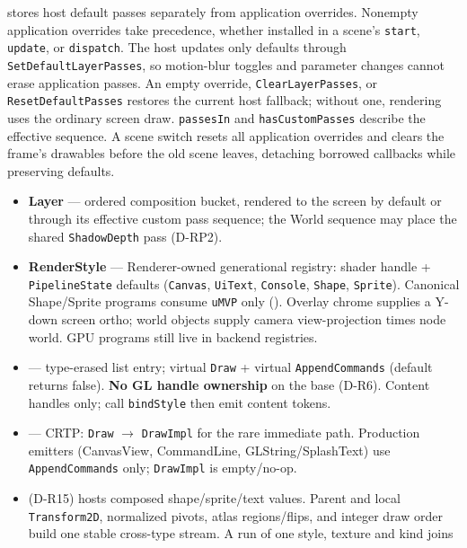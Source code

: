  stores host default passes separately from application
overrides. Nonempty application overrides take precedence, whether installed
in a scene's \texttt{start}, \texttt{update}, or \texttt{dispatch}. The host
updates only defaults through \texttt{SetDefaultLayerPasses}, so motion-blur
toggles and parameter changes cannot erase application passes. An empty
override, \texttt{ClearLayerPasses}, or \texttt{ResetDefaultPasses} restores
the current host fallback; without one, rendering uses the ordinary screen
draw. \texttt{passesIn} and \texttt{hasCustomPasses} describe the effective
sequence. A scene switch resets all application overrides and clears the
frame's drawables before the old scene leaves, detaching borrowed callbacks
while preserving defaults.
\begin{itemize}
  \item \textbf{Layer} --- ordered composition bucket, rendered to the screen
        by default or through its effective custom pass sequence; the World
        sequence may place the shared \texttt{ShadowDepth} pass (D-RP2).
  \item \textbf{RenderStyle} --- Renderer-owned generational registry: shader handle +
        \texttt{PipelineState} defaults (\texttt{Canvas}, \texttt{UiText},
        \texttt{Console}, \texttt{Shape}, \texttt{Sprite}). Canonical Shape/Sprite
        programs consume \texttt{uMVP} only (). Overlay
        chrome supplies a Y-down screen ortho; world objects supply camera
        view-projection times node world. GPU programs still live in backend
        registries.
  \item {} --- type-erased list entry; virtual
        \texttt{Draw} + virtual \texttt{AppendCommands} (default returns false).
        \textbf{No GL handle ownership} on the base (D-R6). Content handles
        only; call \texttt{bindStyle} then emit content tokens.
  \item {} --- CRTP: \texttt{Draw} $\rightarrow$
        \texttt{DrawImpl} for the rare immediate path. Production emitters
        (CanvasView, CommandLine, GLString/SplashText) use
        \texttt{AppendCommands} only; \texttt{DrawImpl} is empty/no-op.
  \item {} (D-R15) hosts composed
        shape/sprite/text values. Parent and local \texttt{Transform2D},
        normalized pivots, atlas regions/flips, and integer draw order build one
        stable cross-type stream. A run of one style, texture and kind joins

\end{itemize}
